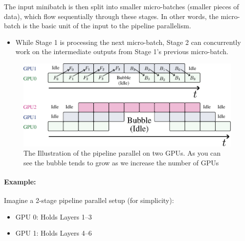 {The input minibatch is then split into smaller micro-batches (smaller pieces of data), which flow sequentially through these stages. In other words, the micro-batch is the basic unit of the input to the pipeline parallelism. 
\begin{itemize}
	\item While Stage 1 is processing the next micro-batch, Stage 2 can concurrently work on the intermediate outputs from Stage 1's previous micro-batch.
\end{itemize}

\begin{figure}[t]
	\centering
	\includegraphics[scale=0.8]{./images/pipeline.pdf}
	\caption{The Illustration of the pipeline parallel on two GPUs. As you can see the bubble tends to grow as we increase the number of GPUs}
\end{figure}

\paragraph{Example:} Imagine a 2-stage pipeline parallel setup (for simplicity):

\begin{itemize}
	\item GPU 0: Holds Layers 1–3  
	\item GPU 1: Holds Layers 4–6  
\end{itemize}

}
